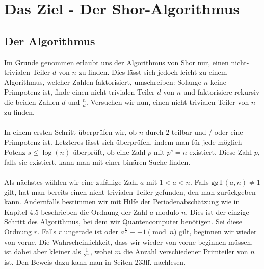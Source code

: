 \section{Das Ziel - Der Shor-Algorithmus}
\subsection{Der Algorithmus}
Im Grunde genommen erlaubt uns der Algorithmus von Shor nur, einen nicht-trivialen Teiler $d$ von $n$ zu finden. Dies lässt sich jedoch leicht zu einem Algorithmus, welcher Zahlen faktorisiert, umschreiben: Solange $n$ keine Primpotenz ist, finde einen nicht-trivialen Teiler $d$ von $n$ und faktorisiere rekursiv die beiden Zahlen $d$ und $\frac{n}{d}$. Versuchen wir nun, einen nicht-trivialen Teiler von $n$ zu finden.

\paragraph{}
In einem ersten Schritt überprüfen wir, ob $n$ durch $2$ teilbar und / oder eine Primpotenz ist. Letzteres lässt sich überprüfen, indem man für jede möglich Potenz $s \leq \log(n)$ überprüft, ob eine Zahl $p$ mit $p^s = n$ existiert. Diese Zahl $p$, falls sie existiert, kann man mit einer binären Suche finden.
\paragraph{}
Als nächstes wählen wir eine zufällige Zahl $a$ mit $1 < a < n$. Falls $\text{ggT}(a, n) \neq 1$ gilt, hat man bereits einen nicht-trivialen Teiler gefunden, den man zurückgeben kann. Andernfalls bestimmen wir mit Hilfe der Periodenabschätzung wie in Kapitel 4.5 beschrieben die Ordnung der Zahl $a$ modulo $n$. Dies ist der einzige Schritt des Algorithmus, bei dem wir Quantencomputer benötigen. Sei diese Ordnung $r$. Falls $r$ ungerade ist oder $a^\frac{r}{2} \equiv -1 \pmod{n}$ gilt, beginnen wir wieder von vorne. Die Wahrscheinlichkeit, dass wir wieder von vorne beginnen müssen, ist dabei aber kleiner als $\frac{1}{2^m}$,  wobei $m$ die Anzahl verschiedener Primteiler von $n$ ist. Den Beweis dazu kann man in \cite{QC} Seiten 233ff. nachlesen.
\paragraph{}

